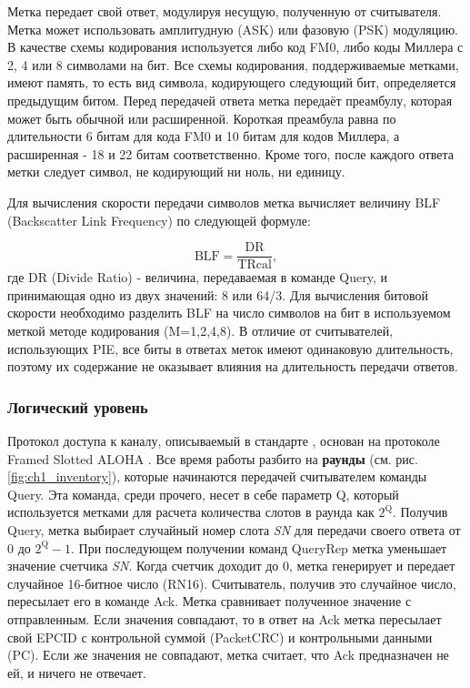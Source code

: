 Метка передает свой ответ, модулируя несущую, полученную от считывателя. Метка может использовать амплитудную (ASK) или фазовую (PSK) модуляцию. В качестве схемы кодирования используется либо код FM0, либо коды Миллера с 2, 4 или 8 символами на бит. Все схемы кодирования, поддерживаемые метками, имеют память, то есть вид символа, кодирующего следующий бит, определяется предыдущим битом. Перед передачей ответа метка передаёт преамбулу, которая может быть обычной или расширенной. Короткая преамбула равна по длительности 6 битам для кода FM0 и 10 битам для кодов Миллера, а расширенная - 18 и 22 битам соответственно. Кроме того, после каждого ответа метки следует символ, не кодирующий ни ноль, ни единицу.

Для вычисления скорости передачи символов метка вычисляет величину BLF (Backscatter Link Frequency) по следующей формуле:

$$
\text{BLF} = \frac{\text{DR}}{\text{TRcal}},
$$
где DR (Divide Ratio) - величина, передаваемая в команде Query, и принимающая одно из двух значений: 8 или 64/3. Для вычисления битовой скорости необходимо разделить BLF на число символов на бит в используемом меткой методе кодирования (M=1,2,4,8). В отличие от считывателей, использующих PIE, все биты в ответах меток имеют одинаковую длительность, поэтому их содержание не оказывает влияния на длительность передачи ответов.



\subsubsection{Логический уровень}\label{sec:ch1_rfid_std_logic}

Протокол доступа к каналу, описываемый в стандарте \cite{StdGen2}, основан на протоколе Framed Slotted ALOHA \cite{Roberts1975, Abramson1970}. Все время работы разбито на \textbf{раунды} (см. рис. \ref{fig:ch1_inventory}), которые начинаются передачей считывателем команды Query. Эта команда, среди прочего, несет в себе параметр Q, который используется метками для расчета количества слотов в раунда как $2^\text{Q}$. Получив Query, метка выбирает случайный номер слота \textit{SN} для передачи своего ответа от 0 до $2^\text{Q}-1$. При последующем получении команд QueryRep метка уменьшает значение счетчика \textit{SN}. Когда счетчик доходит до 0, метка генерирует и передает случайное 16-битное число (RN16). Считыватель, получив это случайное число, пересылает его в команде Ack. Метка сравнивает полученное значение с отправленным. Если значения совпадают, то в ответ на Ack метка пересылает свой EPCID с контрольной суммой (PacketCRC) и контрольными данными (PC). Если же значения не совпадают, метка считает, что Ack предназначен не ей, и ничего не отвечает.

